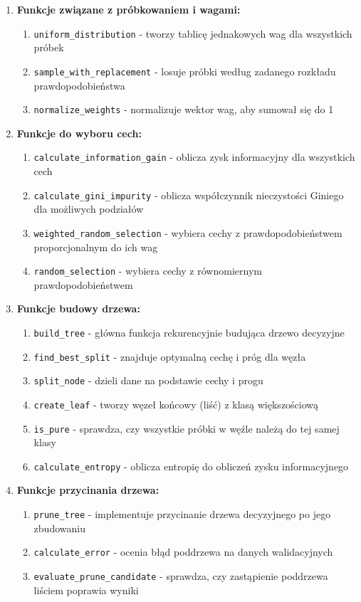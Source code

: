 \documentclass[11pt,a4paper]{article}
\begin{document}
\begin{enumerate}
    \item \textbf{Funkcje związane z próbkowaniem i wagami:}
    \begin{enumerate}
        \item \texttt{uniform\_distribution} - tworzy tablicę jednakowych wag dla wszystkich próbek
        \item \texttt{sample\_with\_replacement} - losuje próbki według zadanego rozkładu prawdopodobieństwa
        \item \texttt{normalize\_weights} - normalizuje wektor wag, aby sumował się do 1
    \end{enumerate}

    \item \textbf{Funkcje do wyboru cech:}
    \begin{enumerate}
        \item \texttt{calculate\_information\_gain} - oblicza zysk informacyjny dla wszystkich cech
        \item \texttt{calculate\_gini\_impurity} - oblicza współczynnik nieczystości Giniego dla możliwych podziałów
        \item \texttt{weighted\_random\_selection} - wybiera cechy z prawdopodobieństwem proporcjonalnym do ich wag
        \item \texttt{random\_selection} - wybiera cechy z równomiernym prawdopodobieństwem
    \end{enumerate}

    \item \textbf{Funkcje budowy drzewa:}
    \begin{enumerate}
        \item \texttt{build\_tree} - główna funkcja rekurencyjnie budująca drzewo decyzyjne
        \item \texttt{find\_best\_split} - znajduje optymalną cechę i próg dla węzła
        \item \texttt{split\_node} - dzieli dane na podstawie cechy i progu
        \item \texttt{create\_leaf} - tworzy węzeł końcowy (liść) z klasą większościową
        \item \texttt{is\_pure} - sprawdza, czy wszystkie próbki w węźle należą do tej samej klasy
        \item \texttt{calculate\_entropy} - oblicza entropię do obliczeń zysku informacyjnego
    \end{enumerate}

    \item \textbf{Funkcje przycinania drzewa:}
    \begin{enumerate}
        \item \texttt{prune\_tree} - implementuje przycinanie drzewa decyzyjnego po jego zbudowaniu
        \item \texttt{calculate\_error} - ocenia błąd poddrzewa na danych walidacyjnych
        \item \texttt{evaluate\_prune\_candidate} - sprawdza, czy zastąpienie poddrzewa liściem poprawia wyniki
    \end{enumerate}


\end{enumerate}
\end{document}
